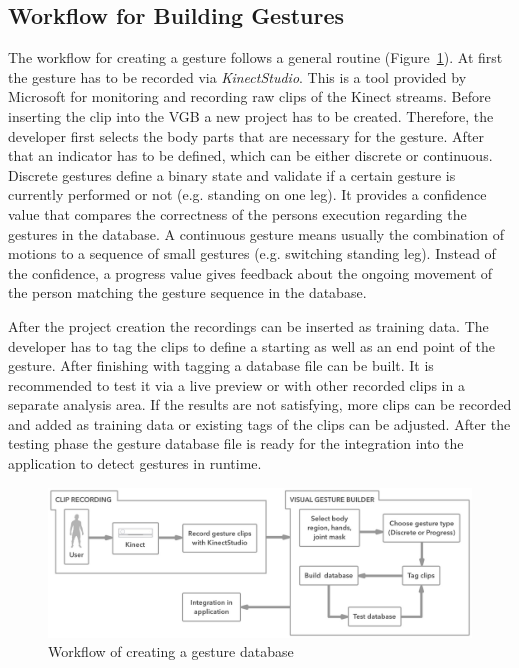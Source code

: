 \subsection{Workflow for Building Gestures}
The workflow for creating a gesture follows a general routine (Figure~\ref{fig:5_3_gestureCreation}).
At first the gesture has to be recorded via \textit{KinectStudio}.
This is a tool provided by Microsoft for monitoring and recording raw clips of the Kinect streams.
Before inserting the clip into the VGB a new project has to be created.
Therefore, the developer first selects the body parts that are necessary for the gesture.
After that an indicator has to be defined, which can be either discrete or continuous.
Discrete gestures define a binary state and validate if a certain gesture is currently performed or not (e.g. standing on one leg).
It provides a confidence value that compares the correctness of the persons execution regarding the gestures in the database.
A continuous gesture means usually the combination of motions to a sequence of small gestures (e.g. switching standing leg).
Instead of the confidence, a progress value gives feedback about the ongoing movement of the person matching the gesture sequence in the database.

After the project creation the recordings can be inserted as training data.
The developer has to tag the clips to define a starting as well as an end point of the gesture.
After finishing with tagging a database file can be built.
It is recommended to test it via a live preview or with other recorded clips in a separate analysis area.
If the results are not satisfying, more clips can be recorded and added as training data or existing tags of the clips can be adjusted.
After the testing phase the gesture database file is ready for the integration into the application to detect gestures in runtime. %
\begin{figure}[htb]
	\centering
	\begin{minipage}[t]{1\linewidth}
		\centering
		\includegraphics[width=1\linewidth]{Pictures/5_3_gestureCreation}
		\caption{Workflow of creating a gesture database}
		\label{fig:5_3_gestureCreation}
	\end{minipage}
\end{figure}